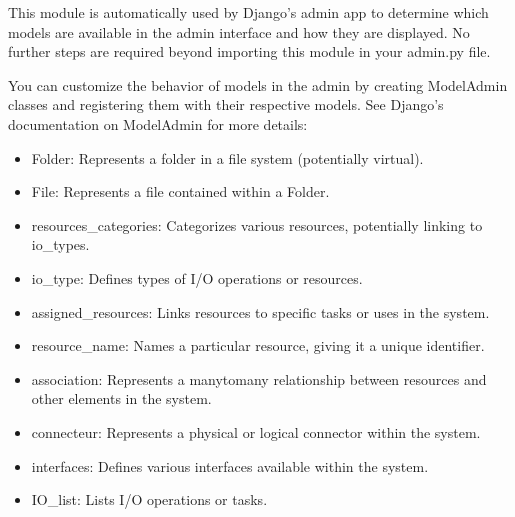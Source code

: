 \documentclass[letterpaper,10pt,english]{sphinxmanual}
\begin{document}
\begin{description}
\sphinxAtStartPar
This module is automatically used by Django’s admin app to determine which models are available in the admin interface and how they are displayed. No further steps are required beyond importing this module in your admin.py file.

\sphinxAtStartPar
You can customize the behavior of models in the admin by creating ModelAdmin classes and registering them with their respective models. See Django’s documentation on ModelAdmin for more details: 

\begin{itemize}
\item {} 
\sphinxAtStartPar
Folder: Represents a folder in a file system (potentially virtual).

\item {} 
\sphinxAtStartPar
File: Represents a file contained within a Folder.

\item {} 
\sphinxAtStartPar
resources\_categories: Categorizes various resources, potentially linking to io\_types.

\item {} 
\sphinxAtStartPar
io\_type: Defines types of I/O operations or resources.

\item {} 
\sphinxAtStartPar
assigned\_resources: Links resources to specific tasks or uses in the system.

\item {} 
\sphinxAtStartPar
resource\_name: Names a particular resource, giving it a unique identifier.

\item {} 
\sphinxAtStartPar
association: Represents a many\sphinxhyphen{}to\sphinxhyphen{}many relationship between resources and other elements in the system.

\item {} 
\sphinxAtStartPar
connecteur: Represents a physical or logical connector within the system.

\item {} 
\sphinxAtStartPar
interfaces: Defines various interfaces available within the system.

\item {} 
\sphinxAtStartPar
IO\_list: Lists I/O operations or tasks.


\end{itemize}
\end{description}
\end{document}

